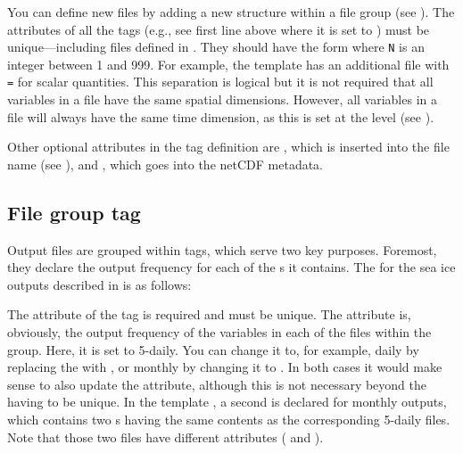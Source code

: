 You can define new files by adding a new  structure within a file group (see ).
The  attributes of all the  tags (e.g., see first line above where it is set to ) must be unique---including files defined in .
They should have the form  where \texttt{N} is an integer between 1 and 999.
For example, the template  has an additional file with \texttt{\textcolor{colxml}{=}} for scalar quantities.
This separation is logical but it is not required that all variables in a file have the same spatial dimensions.
However, all variables in a file will always have the same time dimension, as this is set at the  level (see ).

Other optional attributes in the  tag definition are , which is inserted into the file name (see ), and , which goes into the netCDF metadata.


\subsection{File group tag}
\label{sec:outputs-group-tag}

Output files are grouped within  tags, which serve two key purposes.
Foremost, they declare the output frequency for each of the s it contains.
The  for the sea ice outputs described in  is as follows:

\begingroup\small
\begin{VerbatimXML}
\end{VerbatimXML}
\endgroup

The  attribute of the  tag is required and must be unique.
The attribute  is, obviously, the output frequency of the variables in each of the files within the group.
Here, it is set to 5-daily.
You can change it to, for example, daily by replacing the  with , or monthly by changing it to .
In both cases it would make sense to also update the  attribute, although this is not necessary beyond the  having to be unique.
In the template , a second  is declared for monthly outputs, which contains two s having the same contents as the corresponding 5-daily files.
Note that those two files have different  attributes ( and ).


